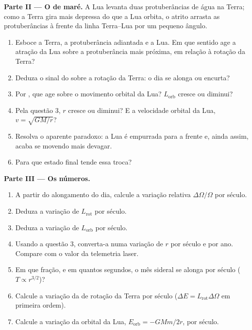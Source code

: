\begin{problem}
\medskip
\noindent\textbf{Parte II --- O  de maré.}
A Lua levanta duas protuberâncias de água na Terra; como a Terra
gira mais depressa do que a Lua orbita, o atrito arrasta as protuberâncias à frente
da linha Terra--Lua por um pequeno ângulo.
\begin{enumerate}[resume]
  \item Esboce a Terra, a protuberância adiantada e a Lua. Em que
        sentido age a atração da Lua sobre a protuberância mais próxima,
        em relação à rotação da Terra?
  \item Deduza o sinal do  sobre a rotação da Terra: o
        dia se alonga ou encurta?
  \item Por , que  age sobre o movimento orbital
        da Lua? $L_{\text{orb}}$ cresce ou diminui?
  \item Pela questão 3, $r$ cresce ou diminui? E a velocidade orbital
        da Lua, $v = \sqrt{GM/r}$?
  \item Resolva o aparente paradoxo: a Lua é empurrada para a frente e, ainda
        assim, acaba se movendo mais devagar.
  \item Para que estado final tende essa troca?
\end{enumerate}

\medskip
\noindent\textbf{Parte III --- Os números.}
\begin{enumerate}[resume]
  \item A partir do alongamento do dia, calcule a variação relativa
        $\Delta\Omega/\Omega$ por século.
  \item Deduza a variação de $L_{\text{rot}}$ por século.
  \item Deduza a variação de $L_{\text{orb}}$ por século.
  \item Usando a questão 3, converta-a numa variação de $r$ por século
        e por ano. Compare com o valor da telemetria laser.
  \item Em que fração, e em quantos segundos, o mês sideral
        se alonga por século ($T \propto r^{3/2}$)?
  \item Calcule a variação da  de rotação da Terra
        por século ($\Delta E = L_{\text{rot}}\Delta\Omega$ em primeira
        ordem).
  \item Calcule a variação da  orbital da Lua,
        $E_{\text{orb}} = -GMm/2r$, por século.
\end{enumerate}


\end{problem}
